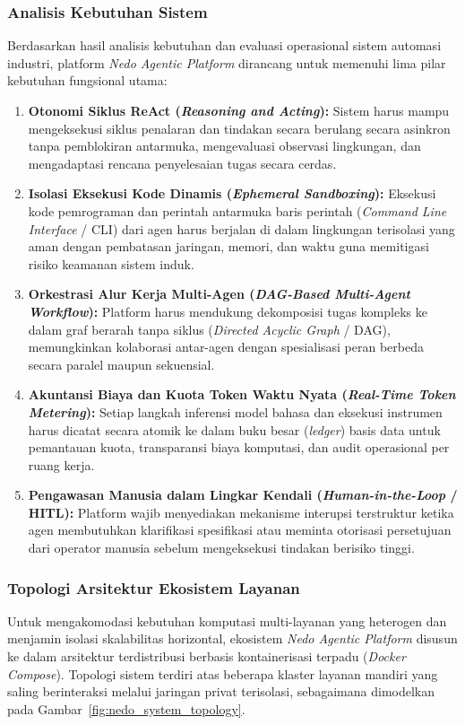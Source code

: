 \subsubsection{Analisis Kebutuhan Sistem}
Berdasarkan hasil analisis kebutuhan dan evaluasi operasional sistem automasi industri, platform \textit{Nedo Agentic Platform} dirancang untuk memenuhi lima pilar kebutuhan fungsional utama:
\begin{enumerate}[label=\alph*.]
  \item \textbf{Otonomi Siklus ReAct (\textit{Reasoning and Acting}):} Sistem harus mampu mengeksekusi siklus penalaran dan tindakan secara berulang secara asinkron tanpa pemblokiran antarmuka, mengevaluasi observasi lingkungan, dan mengadaptasi rencana penyelesaian tugas secara cerdas.
  \item \textbf{Isolasi Eksekusi Kode Dinamis (\textit{Ephemeral Sandboxing}):} Eksekusi kode pemrograman dan perintah antarmuka baris perintah (\textit{Command Line Interface} / CLI) dari agen harus berjalan di dalam lingkungan terisolasi yang aman dengan pembatasan jaringan, memori, dan waktu guna memitigasi risiko keamanan sistem induk.
  \item \textbf{Orkestrasi Alur Kerja Multi-Agen (\textit{DAG-Based Multi-Agent Workflow}):} Platform harus mendukung dekomposisi tugas kompleks ke dalam graf berarah tanpa siklus (\textit{Directed Acyclic Graph} / DAG), memungkinkan kolaborasi antar-agen dengan spesialisasi peran berbeda secara paralel maupun sekuensial.
  \item \textbf{Akuntansi Biaya dan Kuota Token Waktu Nyata (\textit{Real-Time Token Metering}):} Setiap langkah inferensi model bahasa dan eksekusi instrumen harus dicatat secara atomik ke dalam buku besar (\textit{ledger}) basis data untuk pemantauan kuota, transparansi biaya komputasi, dan audit operasional per ruang kerja.
  \item \textbf{Pengawasan Manusia dalam Lingkar Kendali (\textit{Human-in-the-Loop} / HITL):} Platform wajib menyediakan mekanisme interupsi terstruktur ketika agen membutuhkan klarifikasi spesifikasi atau meminta otorisasi persetujuan dari operator manusia sebelum mengeksekusi tindakan berisiko tinggi.
\end{enumerate}

\subsubsection{Topologi Arsitektur Ekosistem Layanan}
Untuk mengakomodasi kebutuhan komputasi multi-layanan yang heterogen dan menjamin isolasi skalabilitas horizontal, ekosistem \textit{Nedo Agentic Platform} disusun ke dalam arsitektur terdistribusi berbasis kontainerisasi terpadu (\textit{Docker Compose}). Topologi sistem terdiri atas beberapa klaster layanan mandiri yang saling berinteraksi melalui jaringan privat terisolasi, sebagaimana dimodelkan pada Gambar~\ref{fig:nedo_system_topology}.

